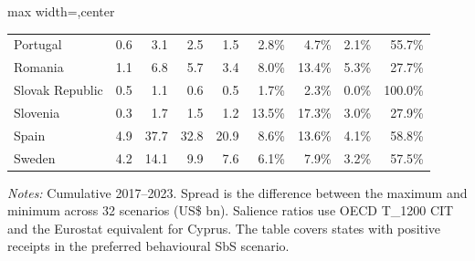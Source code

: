 \begin{table}[H]
\begin{adjustbox}{max width=\textwidth,center}
\begin{tabular}{@{}l rrr r rrrr@{}}
Portugal & 0.6 & 3.1 & 2.5 & 1.5 & 2.8\% & 4.7\% & 2.1\% & 55.7\% \\
Romania & 1.1 & 6.8 & 5.7 & 3.4 & 8.0\% & 13.4\% & 5.3\% & 27.7\% \\
Slovak Republic & 0.5 & 1.1 & 0.6 & 0.5 & 1.7\% & 2.3\% & 0.0\% & 100.0\% \\
Slovenia & 0.3 & 1.7 & 1.5 & 1.2 & 13.5\% & 17.3\% & 3.0\% & 27.9\% \\
Spain & 4.9 & 37.7 & 32.8 & 20.9 & 8.6\% & 13.6\% & 4.1\% & 58.8\% \\
Sweden & 4.2 & 14.1 & 9.9 & 7.6 & 6.1\% & 7.9\% & 3.2\% & 57.5\% \\
\bottomrule
\end{tabular}
\end{adjustbox}

\vspace{0.35em}
\noindent\begin{minipage}{\textwidth}
\footnotesize\raggedright\textit{Notes:} Cumulative 2017–2023. Spread is the difference between the maximum and minimum across 32 scenarios (US\$ bn). Salience ratios use OECD T\_1200 CIT and the Eurostat equivalent for Cyprus. The table covers states with positive receipts in the preferred behavioural SbS scenario.
\end{minipage}
\end{table}
